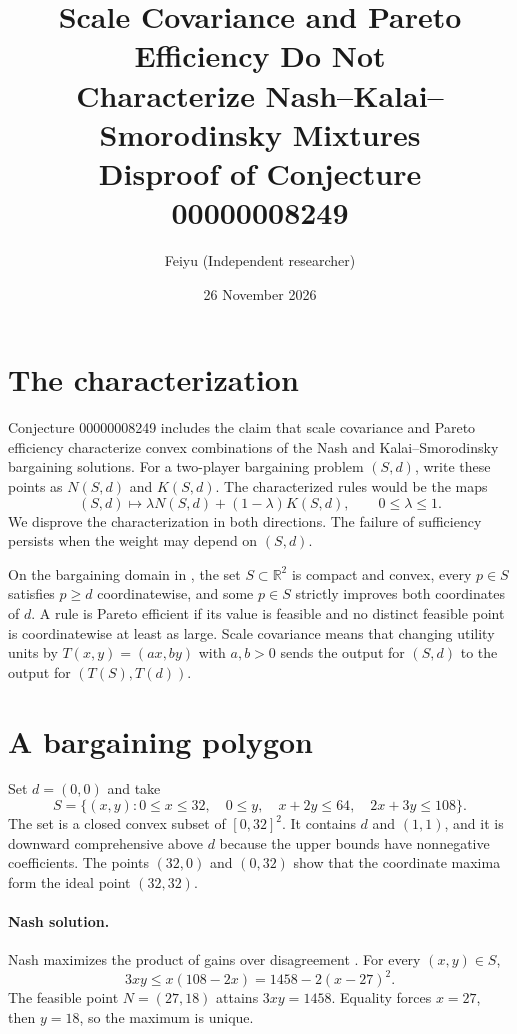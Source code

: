 \documentclass[11pt]{article}
\title{Scale Covariance and Pareto Efficiency Do Not\\
  Characterize Nash--Kalai--Smorodinsky Mixtures\\[4pt]
  \large Disproof of Conjecture 00000008249}
\author{Feiyu (Independent researcher)}
\date{26 November 2026}
\begin{document}
\maketitle

\section{The characterization}

Conjecture 00000008249 includes the claim that scale covariance and
Pareto efficiency characterize convex combinations of the Nash and
Kalai--Smorodinsky bargaining solutions. For a two-player bargaining problem
$(S,d)$, write these points as $N(S,d)$ and $K(S,d)$. The characterized rules
would be the maps
\[
  (S,d)\longmapsto \lambda N(S,d)+(1-\lambda)K(S,d),
  \qquad 0\le\lambda\le1 .
\]
We disprove the characterization in both directions. The failure of
sufficiency persists when the weight may depend on $(S,d)$.

On the bargaining domain in \cite[pp.~513--514]{ks}, the set
$S\subset\mathbb R^2$ is compact and convex, every $p\in S$ satisfies $p\ge d$ coordinatewise, and
some $p\in S$ strictly improves both coordinates of $d$. A rule is Pareto
efficient if its value is feasible and no distinct feasible point is
coordinatewise at least as large. Scale covariance means that changing
utility units by $T(x,y)=(a x,b y)$ with $a,b>0$ sends the output for
$(S,d)$ to the output for $(T(S),T(d))$.

\section{A bargaining polygon}

Set $d=(0,0)$ and take
\[
  S=\{(x,y): 0\le x\le32,\quad 0\le y,\quad
                 x+2y\le64,\quad 2x+3y\le108\}.
\]
The set is a closed convex subset of $[0,32]^2$. It contains $d$ and
$(1,1)$, and it is downward comprehensive above $d$ because the upper
bounds have nonnegative coefficients. The points $(32,0)$ and $(0,32)$
show that the coordinate maxima form the ideal point $(32,32)$.

\paragraph{Nash solution.}
Nash maximizes the product of gains over disagreement
\cite[p.~159]{nash}. For every $(x,y)\in S$,
\[
  3xy\le x(108-2x)=1458-2(x-27)^2 .
\]
The feasible point $N=(27,18)$ attains $3xy=1458$. Equality forces
$x=27$, then $y=18$, so the maximum is unique.
\end{document}
